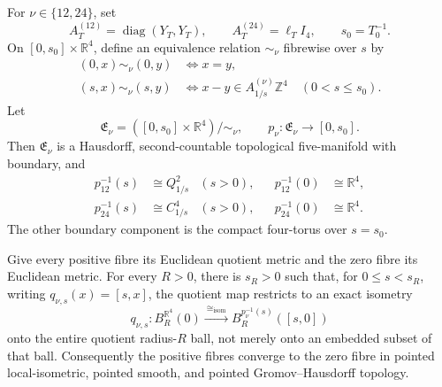 \begin{theorem}
\label{wb:cusp-cone-exact-decompactification-space}

For \(\nu\in\{12,24\}\), set
\[
 A_T^{(12)}=\operatorname{diag}(Y_T,Y_T),
 \qquad
 A_T^{(24)}=\ell_T I_4,
 \qquad s_0=T_0^{-1}.
\]
On \([0,s_0]\times\mathbb R^4\), define an equivalence relation
\(\sim_\nu\) fibrewise over \(s\) by
\begin{align*}
 (0,x)\sim_\nu(0,y)&\iff x=y,\\
 (s,x)\sim_\nu(s,y)&\iff
 x-y\in A_{1/s}^{(\nu)}\mathbb Z^4
 \quad(0<s\leq s_0).
\end{align*}
Let
\[
 \mathfrak E_\nu
 =([0,s_0]\times\mathbb R^4)/\!\sim_\nu,
 \qquad p_\nu:\mathfrak E_\nu\longrightarrow[0,s_0].
\]
Then \(\mathfrak E_\nu\) is a Hausdorff, second-countable topological
five-manifold with boundary, and
\begin{align}
 p_{12}^{-1}(s)&\cong Q_{1/s}^2 &(s>0),&
 &p_{12}^{-1}(0)&\cong\mathbb R^4,
 \label{wb:cusp-cone-E12-fibres}\\
 p_{24}^{-1}(s)&\cong C_{1/s}^4 &(s>0),&
 &p_{24}^{-1}(0)&\cong\mathbb R^4.
 \label{wb:cusp-cone-E24-fibres}
\end{align}
The other boundary component is the compact four-torus over \(s=s_0\).

Give every positive fibre its Euclidean quotient metric and the zero fibre
its Euclidean metric.  For every \(R>0\), there is \(s_R>0\) such that,
for \(0\leq s<s_R\), writing
\(q_{\nu,s}(x)=[s,x]\), the quotient map restricts to an exact isometry
\[
 q_{\nu,s}:B_R^{\mathbb R^4}(0)
 \xrightarrow{\ \cong_{\mathrm{isom}}\ }
 B_R^{p_\nu^{-1}(s)}([s,0])
\]
onto the entire quotient radius-\(R\) ball, not merely onto an embedded
subset of that ball.
Consequently the positive fibres converge to the zero fibre in pointed
local-isometric, pointed smooth, and pointed Gromov--Hausdorff topology.


\end{theorem}
